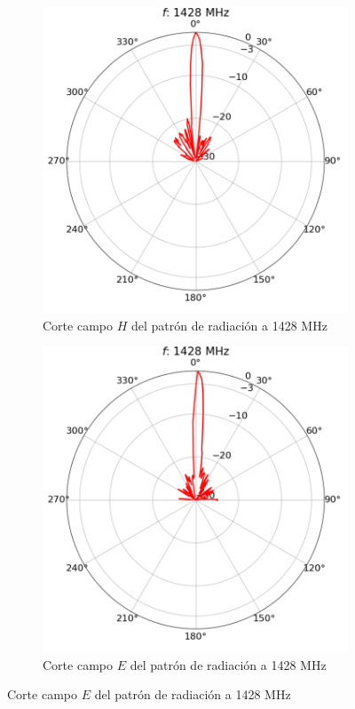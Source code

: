 \begin{figure}[h!]
    \centering
    \begin{subfigure}{0.45\textwidth}
        \includegraphics[width=\textwidth]{img/1420rp}
        \caption{Corte campo $H$ del patrón de radiación a 1428 MHz}
        \label{fig:1420rp}
    \end{subfigure}
    \begin{subfigure}{0.45\textwidth}
        \includegraphics[width=\textwidth]{img/1420rpel}
        \caption{Corte campo $E$ del patrón de radiación a 1428 MHz}
        \label{fig:1420rpel}
    \end{subfigure}
\end{figure}



